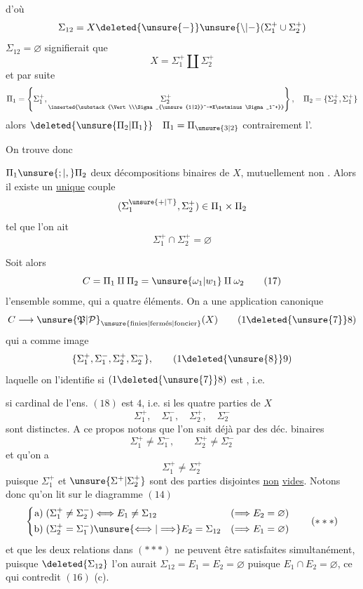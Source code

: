 d'où
\[
\Sigma_{12}=X\deleted{\unsure{-}}\unsure{\setminus|-}(\Sigma_1^+\cup\Sigma_2^+)
\]
 $\Sigma_{12}=\varnothing$ signifierait que
\[
X=\Sigma_1^+\amalg\Sigma_2^+
\]
et par suite
\[
\Pi_1=\left\{\Sigma_1^+,\underset{\inserted{\substack{\Vert\\\Sigma_{\unsure{1|2}}^-=X\setminus\Sigma_1^+}}}{\Sigma_2^+}\right\},
\quad \Pi_2=\{\Sigma_2^+,\Sigma_1^+\}
\]
alors $\deleted{\unsure{\Pi_2|\Pi_1}}\quad\Pi_1=\Pi_{\unsure{3|2}}$ contrairement  l'.

On trouve donc

\noindent\makebox[0pt][r]{\rule[-2.7ex]{.4pt}{3.8ex}\hspace{.45em}}   $\Pi_1\unsure{;|,}\Pi_2$ deux décompositions binaires de $X$, mutuellement non .
Alors il existe un \uline{unique} couple
\[
(\Sigma_1^{\unsure{+|\top}},\Sigma_2^+)\in\Pi_1\times\Pi_2
\]
\makebox[0pt][r]{\rule[-.35ex]{.4pt}{2ex}\hspace{.45em}}tel que l'on ait
\[
\Sigma_1^+\cap\Sigma_2^+=\varnothing
\]

\begingroup\makeatletter\tagsleft@true\makeatother
Soit alors
\[
C=\Pi_1\amalg\Pi_2=\unsure{\omega_1|w_1}\amalg\omega_2
\tag*{(17)}
\]
l'ensemble somme, qui a quatre éléments. On a une application canonique
\[
C\longrightarrow{\unsure{\mathfrak{P}|\mathcal{P}}}_{\unsure{\mathrm{finies}|\mathrm{ferm\acute{e}s}|\mathrm{foncier}}}(X)
\tag*{(1\deleted{\unsure{7}}8)}
\]
qui a comme image
\[
\{\Sigma_1^+,\Sigma_1^-,\Sigma_2^+,\Sigma_2^-\},
\tag*{(1\deleted{\unsure{8}}9)}
\]
 laquelle on l'identifie si $(1\deleted{\unsure{7}}8)$ est , i.e.

\endgroup
\clearpage
\begingroup\makeatletter\tagsleft@true\makeatother
si  cardinal de l'ens. $(18)$ est $4$, i.e. si les quatre parties de $X$
\[
\Sigma_1^+,\quad\Sigma_1^-,\quad\Sigma_2^+,\quad\Sigma_2^-
\]
sont distinctes. A ce propos notons que l'on sait déjà par   des déc. binaires
\[
\Sigma_1^+\ne\Sigma_1^-,\qquad\Sigma_2^+\ne\Sigma_2^-
\tag*{($*$)}
\]
et qu'on a
\[
\Sigma_1^+\ne\Sigma_2^+
\tag*{($**$)}
\]
puisque $\Sigma_1^+$ et $\unsure{\Sigma^+|\Sigma_2^+}$ sont des parties disjointes \uline{non} \uline{vides}. Notons donc qu'on lit sur le diagramme $(14)$
\[
\left\{\begin{aligned}
\text{a)}\;(\Sigma_1^+\ne\Sigma_2^-)&\Longleftrightarrow E_1\ne\Sigma_{12}
   &(\Longrightarrow E_2=\varnothing)\\
\text{b)}\;(\Sigma_2^+=\Sigma_1^-)&\unsure{\Longleftrightarrow|\Longrightarrow} E_2=\Sigma_{12}
   &(\Longrightarrow E_1=\varnothing)
\end{aligned}\right.
\tag*{($***$)}
\]
et que les deux relations   dans $(***)$ ne peuvent être satisfaites simultanément, puisque $\deleted{\Sigma_{12}}$ l'on aurait $\Sigma_{12}=E_1=E_2=\varnothing$ puisque $E_1\cap E_2=\varnothing$, ce qui contredit $(16)$ (c).

